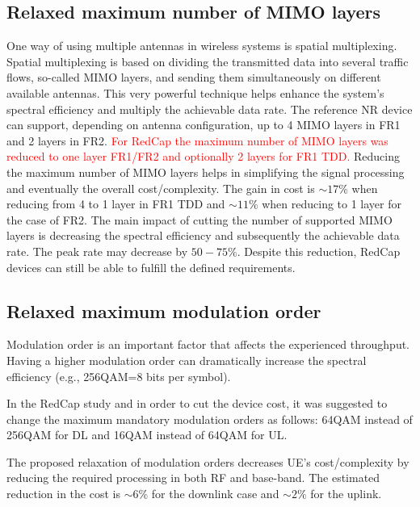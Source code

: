 \documentclass[]{IEEEtran}
\begin{document}
\subsection{Relaxed maximum number of MIMO layers}
\label{sec:4-4}

One way of using multiple antennas in wireless systems is spatial multiplexing. Spatial multiplexing is based on dividing the transmitted data into several traffic flows, so-called MIMO layers, and sending them simultaneously on different available antennas. This very powerful technique helps enhance the system's spectral efficiency and multiply the achievable data rate.
The reference NR device can support, depending on antenna configuration, up to 4 MIMO layers in FR1 and 2 layers in FR2.
\textcolor{red}{
For RedCap the maximum number of MIMO layers was reduced to one layer FR1/FR2 and optionally 2 layers for FR1 TDD.
}
Reducing the maximum number of MIMO layers helps in simplifying the signal processing and eventually the overall cost/complexity. The gain in cost is $\sim17\%$ when reducing from 4 to 1 layer in FR1 TDD and $\sim11\%$ when reducing to 1 layer for the case of FR2.
The main impact of cutting the number of supported MIMO layers is decreasing the spectral efficiency and subsequently the achievable data rate. The peak rate may decrease by $50-75\%$. Despite this reduction, RedCap devices can still be able to fulfill the defined requirements.

\subsection{Relaxed maximum modulation order}
\label{sec:4-5}

Modulation order is an important factor that affects the experienced throughput. Having a higher modulation order can dramatically increase the spectral efficiency (e.g., 256QAM=8 bits per symbol).

In the RedCap study and in order to cut the device cost, it was suggested to change the maximum mandatory modulation orders as follows: 64QAM instead of 256QAM for DL  and 16QAM instead of 64QAM for UL.

The proposed relaxation of modulation orders decreases UE's cost/complexity by reducing the required processing in both RF and base-band. The estimated reduction in the cost is $\sim6\%$ for the downlink case and $\sim2\%$ for the uplink.
\end{document}

